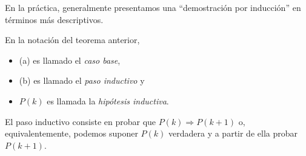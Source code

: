 \documentclass{beamer}
\begin{document}
\begin{frame}	

	
		En la práctica, generalmente presentamos una ``demostración por
	inducción'' en términos más descriptivos. 
	
	\medskip
	
	En la notación del teorema anterior, 
	\medskip
	\begin{itemize}
		\item (a) es llamado  el {\em caso base},
		\item  (b) es llamado el  {\em paso inductivo} y
		\item  $P(k)$ es llamada la {\em hipótesis inductiva}.
	\end{itemize}
	\medskip
	 El paso inductivo  consiste en probar que $P(k) \Rightarrow P(k + 1)$ o, equivalentemente, podemos suponer $P(k)$ verdadera y a partir de ella probar $P(k + 1)$. 
	
\end{frame}

\end{document}
